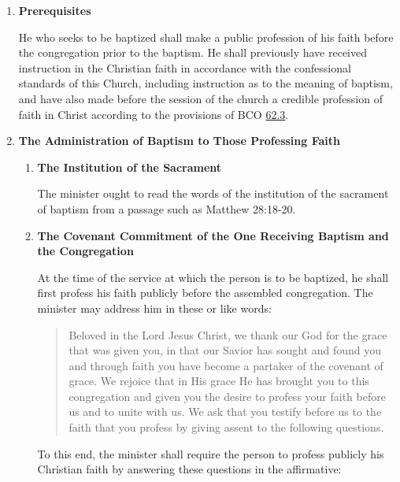 \documentclass[
]{book}
\begin{document}
\begin{enumerate}
\def\labelenumi{\arabic{enumi}.}
\item
  \protect\hypertarget{60}{\href{}{}}\textbf{Prerequisites}

  He who seeks to be baptized shall make a public profession of his faith before the congregation prior to the baptism. He shall previously have received instruction in the Christian faith in accordance with the confessional standards of this Church, including instruction as to the meaning of baptism, and have also made before the session of the church a credible profession of faith in Christ according to the provisions of BCO \protect\hyperlink{62.3}{62.3}.
\item
  \textbf{The Administration of Baptism to Those Professing Faith}

  \begin{enumerate}
  \def\labelenumii{\alph{enumii}.}
  \item
    \textbf{The Institution of the Sacrament}

    The minister ought to read the words of the institution of the sacrament of baptism from a passage such as Matthew 28:18-20.
  \item
    \textbf{The Covenant Commitment of the One Receiving Baptism and the Congregation}

    At the time of the service at which the person is to be baptized, he shall first profess his faith publicly before the assembled congregation. The minister may address him in these or like words:

    \begin{quote}
    Beloved in the Lord Jesus Christ, we thank our God for the grace that was given you, in that our Savior has sought and found you and through faith you have become a partaker of the covenant of grace. We rejoice that in His grace He has brought you to this congregation and given you the desire to profess your faith before us and to unite with us. We ask that you testify before us to the faith that you profess by giving assent to the following questions.
    \end{quote}

    To this end, the minister shall require the person to profess publicly his Christian faith by answering these questions in the affirmative:


\end{enumerate}
\end{enumerate}
\end{document}
